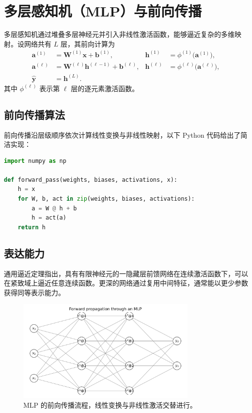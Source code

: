 ﻿\documentclass{ctexart}
\begin{document}
\section{多层感知机（MLP）与前向传播}
多层感知机通过堆叠多层神经元并引入非线性激活函数，能够逼近复杂的多维映射。设网络共有 $L$ 层，其前向计算为
\begin{align}
  \mathbf{a}^{(1)} &= \mathbf{W}^{(1)}\mathbf{x} + \mathbf{b}^{(1)}, & \mathbf{h}^{(1)} &= \phi^{(1)}\bigl(\mathbf{a}^{(1)}\bigr), \\
  \mathbf{a}^{(\ell)} &= \mathbf{W}^{(\ell)}\mathbf{h}^{(\ell-1)} + \mathbf{b}^{(\ell)}, & \mathbf{h}^{(\ell)} &= \phi^{(\ell)}\bigl(\mathbf{a}^{(\ell)}\bigr), \\
  \hat{\mathbf{y}} &= \mathbf{h}^{(L)}.
\end{align}
其中 $\phi^{(\ell)}$ 表示第 $\ell$ 层的逐元素激活函数。

\subsection{前向传播算法}
前向传播沿层级顺序依次计算线性变换与非线性映射，以下 Python 代码给出了简洁实现：

\begin{lstlisting}[language=Python, caption={全连接 MLP 的前向传播示例。}]
import numpy as np

def forward_pass(weights, biases, activations, x):
    h = x
    for W, b, act in zip(weights, biases, activations):
        a = W @ h + b
        h = act(a)
    return h
\end{lstlisting}

\subsection{表达能力}
通用逼近定理指出，具有有限神经元的一隐藏层前馈网络在连续激活函数下，可以在紧致域上逼近任意连续函数。更深的网络通过复用中间特征，通常能以更少参数获得同等表示能力。

\begin{figure}[H]
  \centering
  \includegraphics[width=0.8\textwidth]{mlp_forward_pass.png}
  \caption{MLP 的前向传播流程，线性变换与非线性激活交替进行。}
  \label{fig:mlp_forward_pass}
\end{figure}
\FloatBarrier
\end{document}
